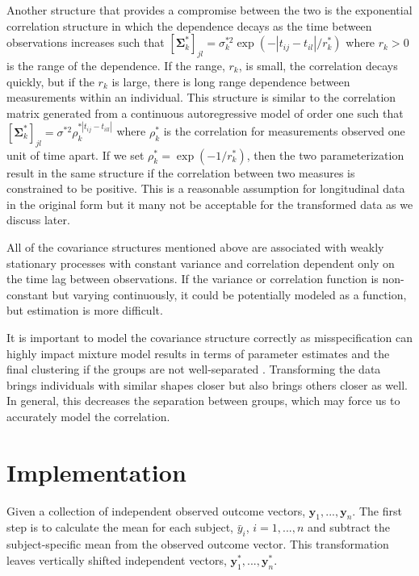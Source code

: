 \documentclass[12pt]{article}
\newcommand{\B}[0]{\mathbf}
\begin{document}
Another structure that provides a compromise between the two is the exponential correlation structure in which the dependence decays as the time between observations increases such that $[\B \Sigma^{*}_{k}]_{jl} = \sigma_{k}^{*2}\exp(-| t_{ij}-t_{il}| / r^{*}_{k})$ where $r_{k}> 0$ is the range of the dependence. If the range, $r_{k}$, is small, the correlation decays quickly, but if the $r_{k}$ is large, there is long range dependence between measurements within an individual. This structure is similar to the correlation matrix generated from a continuous autoregressive model of order one such that $[\B\Sigma^{*}_{k}]_{jl} = \sigma^{*2}\rho_{k}^{*|t_{ij}-t_{ill}|}$ where $\rho^{*}_{k}$ is the correlation for measurements observed one unit of time apart. If we set $\rho^{*}_{k} = \exp(-1/r^{*}_{k})$, then the two parameterization result in the same structure if the correlation between two measures is constrained to be positive. This is a reasonable assumption for longitudinal data in the original form but it many not be acceptable for the transformed data as we discuss later.

All of the covariance structures mentioned above are associated with weakly stationary processes with constant variance and correlation dependent only on the time lag between observations. If the variance or correlation function is non-constant but varying continuously, it could be potentially modeled as a function, but estimation is more difficult.

It is important to model the covariance structure correctly as misspecification can highly impact mixture model results in terms of parameter estimates and the final clustering if the groups are not well-separated \cite{heggeseth2013}. Transforming the data brings individuals with similar shapes closer but also brings others closer as well. In general, this decreases the separation between groups, which may force us to accurately model the correlation. 

\section{Implementation}
Given a collection of independent observed outcome vectors, $\B y_{1},...,\B y_{n}$. The first step is to calculate the mean for each subject, $\bar{y}_{i}$, $i=1,...,n$ and subtract the subject-specific mean from the observed outcome vector. This transformation leaves vertically shifted independent vectors, $\B y^{*}_{1},...,\B y^{*}_{n}$.  
\end{document}
